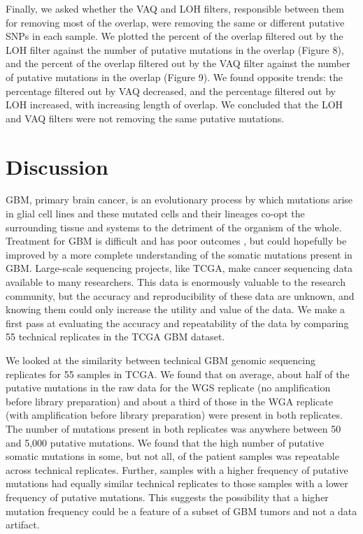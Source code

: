 \documentclass[11pt]{article} %
\begin{document}
Finally, we asked whether the VAQ and LOH filters, responsible between them for removing most of the overlap, were removing the same or different putative SNPs in each sample. We plotted the percent of the overlap filtered out by the LOH filter against the number of putative mutations in the overlap (Figure 8), and the percent of the overlap filtered out by the VAQ filter against the number of putative mutations in the overlap (Figure 9). We found opposite trends: the percentage filtered out by VAQ decreased, and the percentage filtered out by LOH increased, with increasing length of overlap. We concluded that the LOH and VAQ filters were not removing the same putative mutations. 

\section*{Discussion}

GBM, primary brain cancer, is an evolutionary process by which mutations arise in glial cell lines and these mutated cells and their lineages co-opt the surrounding tissue and systems to the detriment of the organism of the whole. Treatment for GBM is difficult and has poor outcomes \citep{GBM-stats}, but could hopefully be improved by a more complete understanding of the somatic mutations present in GBM. Large-scale sequencing projects, like TCGA, make cancer sequencing data available to many researchers. This data is enormously valuable to the research community, but the accuracy and reproducibility of these data are unknown, and knowing them could only increase the utility and value of the data. We make a first pass at evaluating the accuracy and repeatability of the data by comparing 55 technical replicates in the TCGA GBM dataset.  

We looked at the similarity between technical GBM genomic sequencing replicates for 55 samples in TCGA. We found that on average, about half of the putative mutations in the raw data for the WGS replicate (no amplification before library preparation) and about a third of those in the WGA replicate (with amplification before library preparation) were present in both replicates. The number of mutations present in both replicates was anywhere between 50 and 5,000 putative mutations. We found that the high number of putative somatic mutations in some, but not all, of the patient samples was repeatable across technical replicates. Further, samples with a higher frequency of putative mutations had equally similar technical replicates to those samples with a lower frequency of putative mutations. This suggests the possibility that a higher mutation frequency could be a feature of a subset of GBM tumors and not a data artifact.
\end{document}
